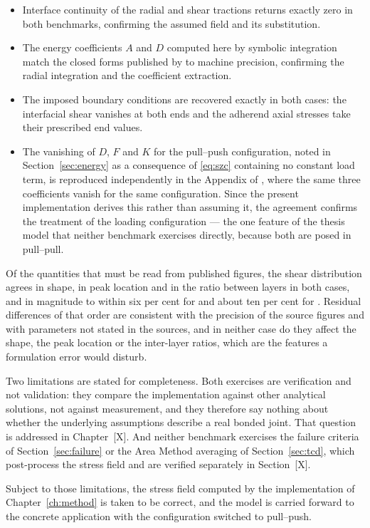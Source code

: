 \begin{itemize}
\item Interface continuity of the radial and shear tractions returns exactly
      zero in both benchmarks, confirming the assumed field and its
      substitution.
\item The energy coefficients $A$ and $D$ computed here by symbolic
      integration match the closed forms published by
      \textcite{hassaniehGluedinrodTimberJoints2018} to machine precision,
      confirming the radial integration and the coefficient extraction.
\item The imposed boundary conditions are recovered exactly in both cases:
      the interfacial shear vanishes at both ends and the adherend axial
      stresses take their prescribed end values.
\item The vanishing of $D$, $F$ and $K$ for the pull--push configuration,
      noted in Section~\ref{sec:energy} as a consequence of
      \eqref{eq:szc} containing no constant load term, is reproduced
      independently in the Appendix of
      \textcite{hassaniehGluedinrodTimberJoints2018}, where the same three
      coefficients vanish for the same configuration. Since the present
      implementation derives this rather than assuming it, the agreement
      confirms the treatment of the loading configuration --- the one feature
      of the thesis model that neither benchmark exercises directly, because
      both are posed in pull--pull.
\end{itemize}
 
Of the quantities that must be read from published figures, the shear
distribution agrees in shape, in peak location and in the ratio between
layers in both cases, and in magnitude to within six per cent for
\textcite{hassaniehGluedinrodTimberJoints2018} and about ten per cent for
\textcite{nemesModelingCylindricalAdhesively2009}. Residual differences of
that order are consistent with the precision of the source figures and with
parameters not stated in the sources, and in neither case do they affect
the shape, the peak location or the inter-layer ratios, which are the
features a formulation error would disturb.
 
Two limitations are stated for completeness. Both exercises are verification
and not validation: they compare the implementation against other analytical
solutions, not against measurement, and they therefore say nothing about
whether the underlying assumptions describe a real bonded joint. That question
is addressed in Chapter~[X]. And neither benchmark exercises the failure
criteria of Section~\ref{sec:failure} or the Area Method averaging of
Section~\ref{sec:tcd}, which post-process the stress field and are verified
separately in Section~[X].
 
Subject to those limitations, the stress field computed by the implementation
of Chapter~\ref{ch:method} is taken to be correct, and the model is carried
forward to the concrete application with the configuration switched to
pull--push.
 